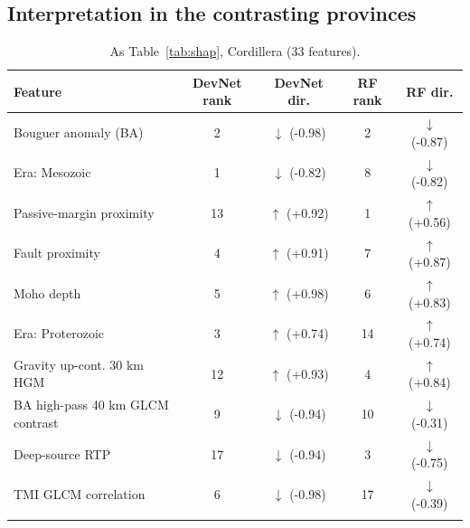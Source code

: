 \documentclass[pdflatex,sn-apa]{sn-jnl}
\begin{document}
\begin{appendices}
\section{Interpretation in the contrasting provinces}\label{app:shap}

\begin{table}[!h]
\caption{As Table~\ref{tab:shap}, Cordillera (33 features).}\label{tab:shap-cord}
\footnotesize
\begin{tabular*}{\textwidth}{@{\extracolsep\fill}lcccc}
\toprule
Feature & DevNet rank & DevNet dir. & RF rank & RF dir. \\
\midrule
Bouguer anomaly (BA) & 2 & $\downarrow$ (-0.98) & 2 & $\downarrow$ (-0.87) \\
Era: Mesozoic & 1 & $\downarrow$ (-0.82) & 8 & $\downarrow$ (-0.82) \\
Passive-margin proximity & 13 & $\uparrow$ (+0.92) & 1 & $\uparrow$ (+0.56) \\
Fault proximity & 4 & $\uparrow$ (+0.91) & 7 & $\uparrow$ (+0.87) \\
Moho depth & 5 & $\uparrow$ (+0.98) & 6 & $\uparrow$ (+0.83) \\
Era: Proterozoic & 3 & $\uparrow$ (+0.74) & 14 & $\uparrow$ (+0.74) \\
Gravity up-cont. 30 km HGM & 12 & $\uparrow$ (+0.93) & 4 & $\uparrow$ (+0.84) \\
BA high-pass 40 km GLCM contrast & 9 & $\downarrow$ (-0.94) & 10 & $\downarrow$ (-0.31) \\
Deep-source RTP & 17 & $\downarrow$ (-0.94) & 3 & $\downarrow$ (-0.75) \\
TMI GLCM correlation & 6 & $\downarrow$ (-0.98) & 17 & $\downarrow$ (-0.39) \\
\botrule
\end{tabular*}
\end{table}


\end{appendices}
\end{document}
